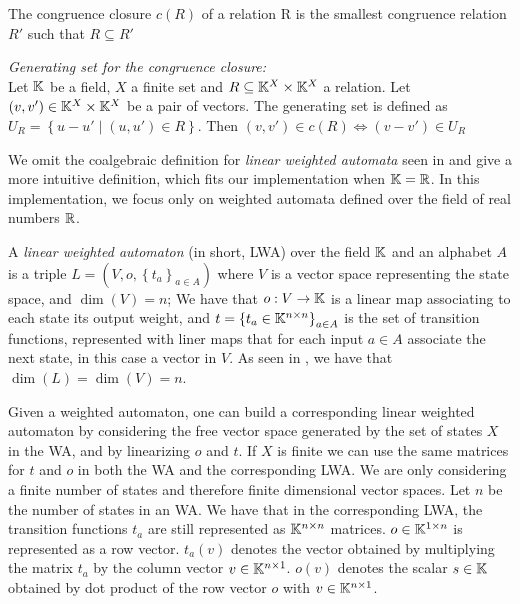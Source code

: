 \begin{defn}
  The congruence closure $c(R)$ of a relation R is the smallest congruence relation 
  $R'$ such that $R \subseteq R'$ 
\end{defn}

\begin{defn}
  \label{def:congclos}
  \textit{Generating set for the congruence closure:} \\
  Let $\mathbb{K}$ be a field, $X$ a finite set and $R \subseteq \mathbb{K}^X \times \mathbb{K}^X$
  a relation. Let $(v, v') \in \mathbb{K}^X \times \mathbb{K}^X$ be a pair of vectors.
  The generating set is defined as  $U_R = \left\lbrace u - u' \mid (u, u') \in R \right\rbrace$.
  Then $(v, v') \in c(R) \iff (v - v') \in U_R$
\end{defn}




We omit the coalgebraic definition for \textit{linear weighted automata} seen in 
\cite{BONCHI201277} and give a more intuitive definition, which fits our  
implementation when $\mathbb{K} = \mathbb{R}$.
In this implementation, we focus only on weighted automata defined over 
the field of real numbers $\mathbb{R}$. 

\begin{defn}
  A \textit{linear weighted automaton} (in short, LWA) over the field $\mathbb{K}$ and 
  an alphabet $A$
  is a triple  $L = (V, o, \left\lbrace t_a \right\rbrace_{a \in A})$ 
  where $V$ is a vector space representing the state space, and $\dim{(V)} = n$;
  We have that
  $o: V \to \mathbb{K}$ is a linear map associating to each state its output weight,
  and $t = \left\lbrace t_a \in \mathbb{K}^{n \times n} \right\rbrace_{a \in A}$ is
  the set of transition functions, represented with liner maps 
  that for each input $a \in A$ associate the next state, in this case a vector
  in $V$.
  As seen in \cite{boreale2009weighted}, we have that $\dim{(L)} = \dim{(V)} = n$.
\end{defn}

Given a weighted automaton, one can build a corresponding linear weighted automaton
by considering the free vector space generated by the set of states $X$ in the WA,
and by linearizing $o$ and $t$. If $X$ is finite we can use the same matrices for 
$t$ and $o$ in both the WA and the corresponding LWA.
We are only considering a finite number of states and therefore finite dimensional
vector spaces. Let $n$ be the number of states in an WA.
We have that in the corresponding LWA, the transition functions $t_a$ are still
 represented as
$\mathbb{K}^{n \times n}$ matrices. $o \in \mathbb{K}^{1 \times n}$ is represented as a row vector.
$t_a(v)$ denotes the vector obtained by multiplying the matrix $t_a$ by the column 
vector $v  \in \mathbb{K}^{n \times 1}$. $o(v)$ denotes the scalar $s \in \mathbb{K}$ obtained by 
dot product of the row vector $o$ with $v \in \mathbb{K}^{n \times 1}$.

